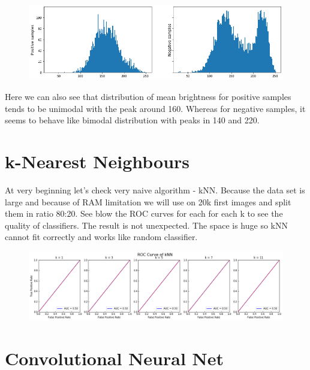 \documentclass[12pt, a4paper]{article}
\begin{document}
\begin{figure}[ht]
	\centering
	\includegraphics[width =16cm]{brightness.png}
\end{figure}

\noindent
Here we can also see that distribution of mean brightness for positive samples tends to be unimodal with the peak around 160. Whereas for negative samples, it seems to behave like bimodal distribution with peaks in 140 and 220.

\section{k-Nearest Neighbours}

\noindent
At very beginning let's check very naive algorithm - kNN. Because the data set is large and because of RAM limitation we will use on 20k first images and split them in ratio 80:20. See blow the ROC curves for each for each k to see the quality of classifiers. The result is not unexpected. The space is huge so kNN cannot fit correctly and works like random classifier.

\begin{figure}[ht]
	\centering
	\includegraphics[width =16cm]{roc_knn.png}
\end{figure}

\newpage
\section{Convolutional Neural Net}
\end{document}
